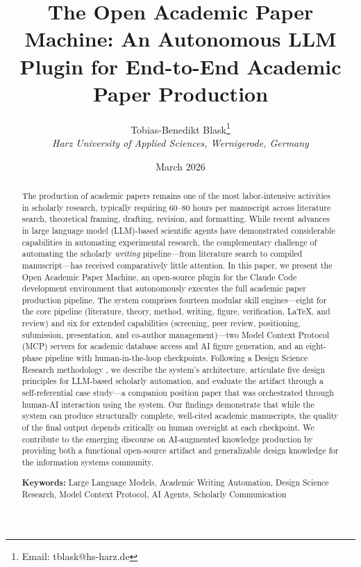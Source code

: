 \documentclass{article}
\title{\textbf{The Open Academic Paper Machine: An Autonomous LLM Plugin for End-to-End Academic Paper Production}}
\author{
  Tobias-Benedikt Blask\thanks{Email: tblask@hs-harz.de} \\
  \textit{Harz University of Applied Sciences, Wernigerode, Germany}
}
\date{March 2026}
\begin{document}
\maketitle

\begin{abstract}
The production of academic papers remains one of the most labor-intensive activities in scholarly research, typically requiring 60--80 hours per manuscript across literature search, theoretical framing, drafting, revision, and formatting. While recent advances in large language model (LLM)-based scientific agents have demonstrated considerable capabilities in automating experimental research, the complementary challenge of automating the scholarly \emph{writing} pipeline---from literature search to compiled manuscript---has received comparatively little attention. In this paper, we present the Open Academic Paper Machine, an open-source plugin for the Claude Code development environment that autonomously executes the full academic paper production pipeline. The system comprises fourteen modular skill engines---eight for the core pipeline (literature, theory, method, writing, figure, verification, \LaTeX, and review) and six for extended capabilities (screening, peer review, positioning, submission, presentation, and co-author management)---two Model Context Protocol (MCP) servers for academic database access and AI figure generation, and an eight-phase pipeline with human-in-the-loop checkpoints. Following a Design Science Research methodology \citep{peffers2007dsrm}, we describe the system's architecture, articulate five design principles for LLM-based scholarly automation, and evaluate the artifact through a self-referential case study---a companion position paper \citep{blask2026creator} that was orchestrated through human-AI interaction using the system. Our findings demonstrate that while the system can produce structurally complete, well-cited academic manuscripts, the quality of the final output depends critically on human oversight at each checkpoint. We contribute to the emerging discourse on AI-augmented knowledge production by providing both a functional open-source artifact and generalizable design knowledge for the information systems community.

\medskip
\noindent\textbf{Keywords:} Large Language Models, Academic Writing Automation, Design Science Research, Model Context Protocol, AI Agents, Scholarly Communication
\end{abstract}

\end{document}

